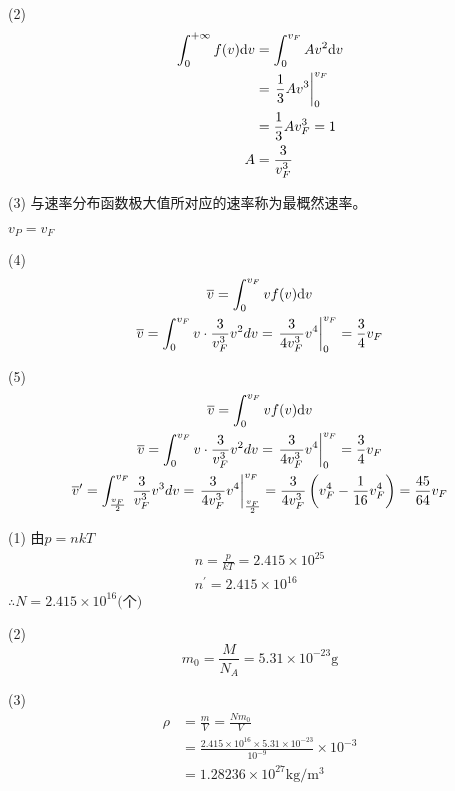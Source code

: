 (2)
\begin{align*}
\int _ { 0 } ^ {+\infty}f(v)\mathrm{d}v
&=\int _ { 0 } ^ {v_F}Av^2\mathrm{d}v\\
&=\left. \dfrac { 1 } { 3 } A v ^ { 3 } \right| _ { 0 } ^ { v _ { F } }\\
&=\dfrac { 1 } { 3 } A v_F^3= 1 \\ 
A&=\dfrac{3}{ v_F^3 }
\end{align*}

(3)
与速率分布函数极大值所对应的速率称为最概然速率。

\therefore $v_P=v_F$

(4)
\begin{gather*}
{\overline{ v } = \int _ { 0 } ^ { v _ { F } } v f ( v )\mathrm{d}v} \\
 {\overline{ v } = \int _ { 0 } ^ { v _ { F } } v \cdot \frac { 3 } { v _ { F } ^ { 3 } } v ^ { 2 } d v = \left. \frac { 3 } { 4 v _ { F } ^ { 3 } } v ^ { 4 } \right| _ { 0 } ^ { v _ { F } } = \frac { 3 } { 4 } v _ { F } } 
\end{gather*}

(5)
\begin{gather*}
 {\overline{ v } = \int _ { 0 } ^ { v _F} v f ( v )\mathrm{d}v} \\
{\overline{ v } = \int _ { 0 } ^ { v _ { F } } v \cdot \frac { 3 } { v _ { F } ^ { 3 } } v ^ { 2 } d v = \left. \frac { 3 } { 4 v _ { F } ^ { 3 } } v ^ { 4 } \right| _ { 0 } ^ { v _ { F } } = \frac { 3 } { 4 } v _ { F } } \\
{\overline{ v } ^ { \prime } = \int _ { \frac { v _ { F } } { 2 } } ^ { v _ { F } } \frac { 3 } { v _ { F } ^ { 3 } } v ^ { 3 } d v = \left. \frac { 3 } { 4 v _ { F } ^ { 3 } } v ^ { 4 } \right| _ { \frac { v _ { F } } { 2 } } ^ { v _ { F } } = \frac { 3 } { 4 v _ { F } ^ { 3 } } \left( v _ { F } ^ { 4 } - \frac { 1 } { 16 } v _F^4\right) = \frac { 45 } { 64 } v _F}
\end{gather*}

\exercise

\solve
(1)
由$p = n k T$
\begin{gather*}
n = \frac { p } { k T } = 2.415 \times 10 ^ { 25 } \\ 
n ^ { \prime } = 2.415 \times 10 ^ { 16 }
\end{gather*}
$\therefore N=2.415\times 10^{16}\mbox{(个)}$

(2)
$$
m_0= \frac { M } {N_A} = 5.31 \times 10 ^{-23}\mathrm{g}
$$

(3)
\begin{align*}
\rho &= \frac {m} { V } = \frac {Nm_0}{V}\\
&= \frac { 2.415 \times 10 ^ { 16 } \times 5.31 \times 10 ^ { - 23 } } { 10 ^ { - 9 } } \times 10 ^ { - 3 } \\
&= 1.28236 \times 10^{27}\mathrm{kg/m^3}
\end{align*}

